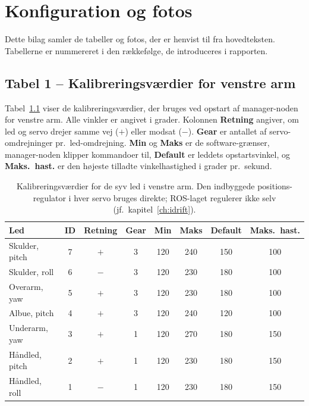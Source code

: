 
\chapter{Konfiguration og fotos}
\label{AppendixB}

Dette bilag samler de tabeller og fotos, der er henvist til fra
hovedteksten. Tabellerne er nummereret i den rækkefølge, de
introduceres i rapporten.

\section{Tabel 1 -- Kalibreringsværdier for venstre arm}
\label{tab:kalibrering}

Tabel~\ref{tab:kalibrering-tab} viser de kalibreringsværdier, der
bruges ved opstart af manager-noden for venstre arm. Alle vinkler er
angivet i grader. Kolonnen \textbf{Retning} angiver, om led og servo
drejer samme vej ($+$) eller modsat ($-$). \textbf{Gear} er antallet
af servo-omdrejninger pr.~led-omdrejning. \textbf{Min} og \textbf{Maks}
er de software-grænser, manager-noden klipper kommandoer til,
\textbf{Default} er leddets opstartsvinkel, og \textbf{Maks.\ hast.}
er den højeste tilladte vinkelhastighed i grader pr.~sekund.

\begin{table}[H]
\centering
\caption{Kalibreringsværdier for de syv led i venstre arm. Den
indbyggede positions-regulator i hver servo bruges direkte; ROS-laget
regulerer ikke selv (jf.~kapitel~\ref{ch:idrift}).}
\label{tab:kalibrering-tab}
\begin{tabular}{lccccccc}
\toprule
\textbf{Led} & \textbf{ID} & \textbf{Retning} & \textbf{Gear} & \textbf{Min} & \textbf{Maks} & \textbf{Default} & \textbf{Maks.\ hast.} \\
\midrule
Skulder, pitch  & 7 & $+$ & 3 & 120 & 240 & 150 & 100 \\
Skulder, roll   & 6 & $-$ & 3 & 120 & 230 & 180 & 100 \\
Overarm, yaw    & 5 & $+$ & 3 & 120 & 230 & 180 & 100 \\
Albue, pitch    & 4 & $+$ & 3 & 120 & 240 & 120 & 100 \\
Underarm, yaw   & 3 & $+$ & 1 & 120 & 270 & 180 & 150 \\
Håndled, pitch  & 2 & $+$ & 1 & 120 & 230 & 180 & 150 \\
Håndled, roll   & 1 & $-$ & 1 & 120 & 230 & 180 & 150 \\
\bottomrule
\end{tabular}
\end{table}

